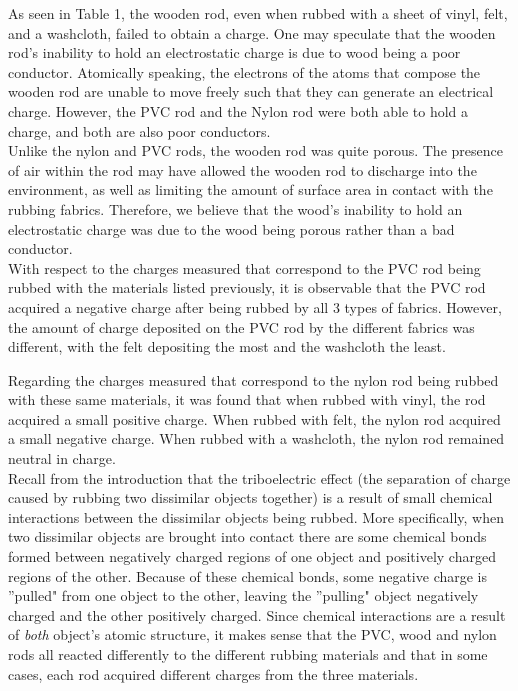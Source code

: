 \documentclass[12pt]{amsart}
\begin{document}
\indent As seen in Table 1, the wooden rod, even when rubbed with a sheet of vinyl, felt, and a washcloth, failed to obtain a charge. One may speculate that the wooden rod's inability to hold an electrostatic charge is due to wood being a poor conductor. Atomically speaking, the electrons of the atoms that compose the wooden rod are unable to move freely such that they can generate an electrical charge. However, the PVC rod and the Nylon rod were both able to hold a charge, and both are also poor conductors.\\
\indent Unlike the nylon and PVC rods, the wooden rod was quite porous. The presence of air within the rod may have allowed the wooden rod to discharge into the environment, as well as limiting the amount of surface area in contact with the rubbing fabrics. Therefore, we believe that the wood's inability to hold an electrostatic charge was due to the wood being porous rather than a bad conductor.\\

\indent With respect to the charges measured that correspond to the PVC rod being rubbed with the materials listed previously, it is observable that the PVC rod acquired a negative charge after being rubbed by all 3 types of fabrics. However, the amount of charge deposited on the PVC rod by the different fabrics was different, with the felt depositing the most and the washcloth the least.
 
\indent Regarding the charges measured that correspond to the nylon rod being rubbed with these same materials, it was found that when rubbed with vinyl, the rod acquired a small positive charge. When rubbed with felt, the nylon rod acquired a small negative charge. When rubbed with a washcloth, the nylon rod remained neutral in charge.\\

\indent Recall from the introduction that the triboelectric effect (the separation of charge caused by rubbing two dissimilar objects together) is a result of small chemical interactions between the dissimilar objects being rubbed. More specifically, when two dissimilar objects are brought into contact there are some chemical bonds formed between negatively charged regions of one object and positively charged regions of the other. Because of these chemical bonds, some negative charge is ''pulled" from one object to the other, leaving the ''pulling" object negatively charged and the other positively charged. Since chemical interactions are a result of \textit{both} object's atomic structure, it makes sense that the PVC, wood and nylon rods all reacted differently to the different rubbing materials and that in some cases, each rod acquired different charges from the three materials.\\
\end{document}
